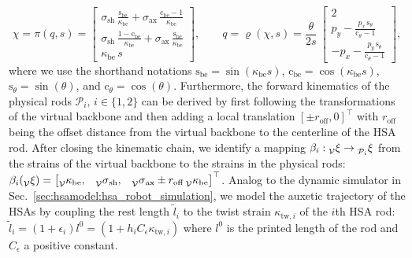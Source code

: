 \begin{equation}\label{eq:hsamodel:planar_hsa_robot_model:kinematics}
    \chi = \pi(q, s) = \begin{bmatrix}
        \sigma_\mathrm{sh} \, \frac{\mathrm{s}_\mathrm{be}}{\kappa_\mathrm{be}} + \sigma_\mathrm{ax} \, \frac{\mathrm{c}_\mathrm{be}-1}{\kappa_\mathrm{be}}\\
        \sigma_\mathrm{sh} \, \frac{1-\mathrm{c}_\mathrm{be}}{\kappa_\mathrm{be}} + \sigma_\mathrm{ax} \, \frac{\mathrm{s}_\mathrm{be}}{\kappa_\mathrm{be}}\\
        \kappa_\mathrm{be} \, s
    \end{bmatrix},
    \qquad
    q = \varrho(\chi, s) 
    = \frac{\theta}{2s} \: \begin{bmatrix}
        2\\
        p_y - \frac{p_x \, \mathrm{s}_\theta}{\mathrm{c}_\theta-1}\\
        -p_x - \frac{p_y \, \mathrm{s}_\theta}{\mathrm{c}_\theta-1}
   \end{bmatrix},
\end{equation}
where we use the shorthand notations $\mathrm{s}_\mathrm{be} = \sin(\kappa_\mathrm{be}s)$, $\mathrm{c}_\mathrm{be} = \cos(\kappa_\mathrm{be}s)$, $\mathrm{s}_\theta = \sin(\theta)$, and $\mathrm{c}_\theta = \cos(\theta)$.
Furthermore, the forward kinematics of the physical rods $\mathcal{P}_i, \, i \in \{1, 2\}$ can be derived by first following the transformations of the virtual backbone and then adding a local translation $[\pm r_{\mathrm{off}},0]^\top$ with $r_\mathrm{off}$ being the offset distance from the virtual backbone to the centerline of the \gls{HSA} rod. 
After closing the kinematic chain, we identify a mapping $\beta_i: \prescript{}{\mathcal{V}}{\xi} \rightarrow \prescript{}{\mathcal{P}_i}{\xi}$ from the strains of the virtual backbone to the strains in the physical rods: $\beta_i(\prescript{}{\mathcal{V}}{\xi}) = \begin{bmatrix}
    \prescript{}{\mathcal{V}}{\kappa}_\mathrm{be}, & \prescript{}{\mathcal{V}}{\sigma}_\mathrm{sh}, & \prescript{}{\mathcal{V}}{\sigma}_\mathrm{ax} \pm r_{\mathrm{off}}  \prescript{}{\mathcal{V}}{\kappa}_\mathrm{be}
\end{bmatrix}^\top$.
% 
Analog to the dynamic simulator in Sec.~\ref{sec:hsamodel:hsa_robot_simulation}, we model the auxetic trajectory of the \glspl{HSA} by coupling the rest length $\tilde{l}_i$ to the twist strain $\kappa_{\mathrm{tw},i}$ of the $i$th \gls{HSA} rod: $\tilde{l}_i = (1 + \epsilon_i) l^0 = (1 + h_i C_\epsilon \kappa_{\mathrm{tw},i})$ where $l^0$ is the printed length of the rod and $C_\epsilon$ a positive constant.
